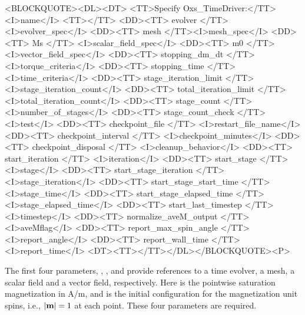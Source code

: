 \begin{description}
\begin{rawhtml}
<BLOCKQUOTE><DL><DT>
<TT>Specify Oxs_TimeDriver:</TT><I>name</I> <TT>{</TT>
<DD><TT> evolver </TT><I>evolver_spec</I>
<DD><TT> mesh </TT><I>mesh_spec</I>
<DD><TT> Ms </TT> <I>scalar_field_spec</I>
<DD><TT> m0 </TT> <I>vector_field_spec</I>
<DD><TT> stopping_dm_dt </TT><I>torque_criteria</I>
<DD><TT> stopping_time </TT><I>time_criteria</I>
<DD><TT> stage_iteration_limit </TT><I>stage_iteration_count</I>
<DD><TT> total_iteration_limit </TT><I>total_iteration_count</I>
<DD><TT> stage_count </TT><I>number_of_stages</I>
<DD><TT> stage_count_check </TT><I>test</I>
<DD><TT> checkpoint_file </TT> <I>restart_file_name</I>
<DD><TT> checkpoint_interval </TT> <I>checkpoint_minutes</I>
<DD><TT> checkpoint_disposal </TT> <I>cleanup_behavior</I>
<DD><TT> start_iteration </TT> <I>iteration</I>
<DD><TT> start_stage </TT> <I>stage</I>
<DD><TT> start_stage_iteration </TT> <I>stage_iteration</I>
<DD><TT> start_stage_start_time </TT> <I>stage_time</I>
<DD><TT> start_stage_elapsed_time </TT> <I>stage_elapsed_time</I>
<DD><TT> start_last_timestep </TT> <I>timestep</I>
<DD><TT> normalize_aveM_output </TT> <I>aveMflag</I>
<DD><TT> report_max_spin_angle </TT> <I>report_angle</I>
<DD><TT> report_wall_time </TT> <I>report_time</I>
<DT><TT>}</TT></DL></BLOCKQUOTE><P>
\end{rawhtml}
The first four parameters, , ,
 and  provide references to a time evolver, a
mesh, a scalar field and a vector field, respectively.  Here  is
the pointwise saturation magnetization in A/m, and  is the
initial configuration for the magnetization unit spins, i.e., $|\textbf{m}|=1$
at each point.  These four parameters are required.


\end{description}
